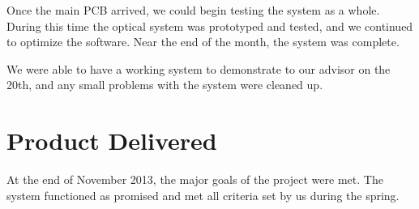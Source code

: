 Once the main PCB arrived, we could begin testing the system as a whole.
During this time the optical system was prototyped and tested, and we
continued to optimize the software. Near the end of the month, the system was
complete.

We were able to have a working system to demonstrate to our advisor on the 20th,
and any small problems with the system were cleaned up.

\section{Product Delivered}

At the end of November 2013, the major goals of the project were met. The system
functioned as promised and met all criteria set by us during the spring.

